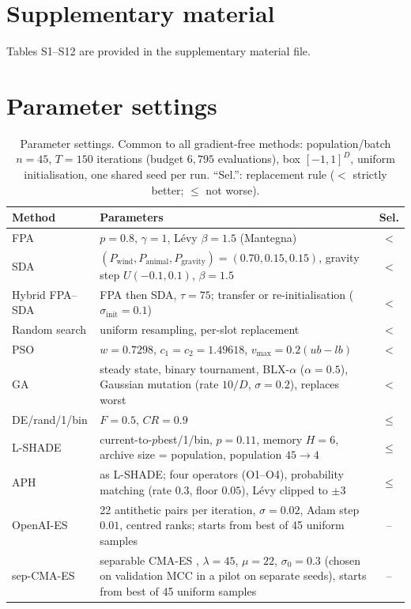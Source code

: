 \documentclass[preprint,12pt]{elsarticle}
\begin{document}
\section*{Supplementary material}
Tables S1--S12 are provided in the supplementary material file.

\appendix
\section{Parameter settings}\label{app:params}
\setcounter{table}{0}
\begin{table}[!ht]
\centering
\caption{Parameter settings. Common to all gradient-free methods: population/batch $n=45$, $T=150$ iterations (budget $6{,}795$ evaluations), box $[-1,1]^D$, uniform initialisation, one shared seed per run. ``Sel.'': replacement rule ($<$ strictly better; $\le$ not worse).}
\label{tab:params}
\footnotesize
\begin{tabular}{p{2.6cm}p{8.6cm}c}
\toprule
Method & Parameters & Sel. \\
\midrule
FPA & $p=0.8$, $\gamma=1$, Lévy $\beta=1.5$ (Mantegna) & $<$ \\
SDA & $(P_{\mathrm{wind}},P_{\mathrm{animal}},P_{\mathrm{gravity}})=(0.70,0.15,0.15)$, gravity step $U(-0.1,0.1)$, $\beta=1.5$ & $<$ \\
Hybrid FPA--SDA & FPA then SDA, $\tau=75$; transfer or re-initialisation ($\sigma_{\mathrm{init}}=0.1$) & $<$ \\
Random search & uniform resampling, per-slot replacement & $<$ \\
PSO & $w=0.7298$, $c_1=c_2=1.49618$, $v_{\max}=0.2(ub-lb)$ & $<$ \\
GA & steady state, binary tournament, BLX-$\alpha$ ($\alpha=0.5$), Gaussian mutation (rate $10/D$, $\sigma=0.2$), replaces worst & $<$ \\
DE/rand/1/bin & $F=0.5$, $CR=0.9$ & $\le$ \\
L-SHADE & current-to-$p$best/1/bin, $p=0.11$, memory $H=6$, archive size = population, population $45\to4$ & $\le$ \\
APH & as L-SHADE; four operators (O1--O4), probability matching (rate $0.3$, floor $0.05$), Lévy clipped to $\pm3$ & $\le$ \\
OpenAI-ES & 22 antithetic pairs per iteration, $\sigma=0.02$, Adam step $0.01$, centred ranks; starts from best of 45 uniform samples & -- \\
sep-CMA-ES & separable CMA-ES \citep{ros2008sepcma}, $\lambda=45$, $\mu=22$, $\sigma_0=0.3$ (chosen on validation MCC in a pilot on separate seeds), starts from best of 45 uniform samples & -- \\

\end{tabular}
\end{table}
\end{document}
